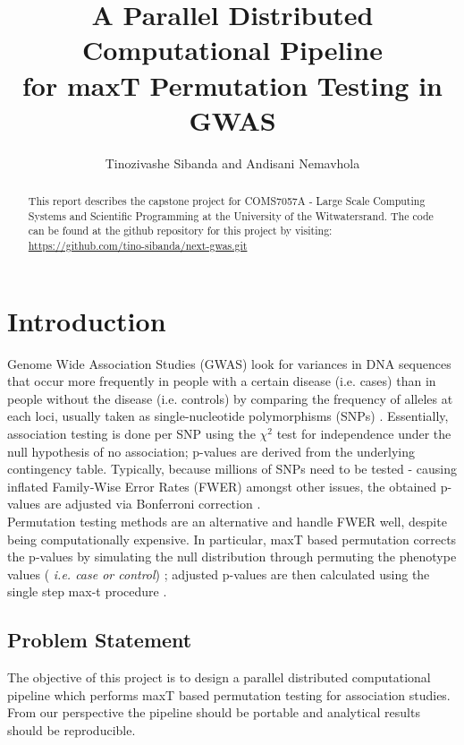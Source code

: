 \documentclass[12pt]{article}
\begin{document}
\title{ A Parallel Distributed Computational Pipeline \\ for maxT Permutation Testing in GWAS
}
\author{Tinozivashe Sibanda and Andisani Nemavhola}

\maketitle
\begin{abstract}
This report describes the capstone project for COMS7057A - Large Scale Computing Systems and Scientific Programming at the University of the Witwatersrand. The code can be found at the github repository for this project by visiting:  \href{next-gwas}{https://github.com/tino-sibanda/next-gwas.git}
\end{abstract}

\section{Introduction}

Genome Wide Association Studies (GWAS) look for variances in DNA sequences that occur more frequently in people with a certain disease (i.e. cases) than in people without the disease (i.e. controls)\cite{Chang2018} by comparing the frequency of alleles at each loci, usually taken as single-nucleotide polymorphisms (SNPs) \cite{Dickhaus2012}. Essentially, association testing is done per SNP using the $\chi^2$ test for independence under the null hypothesis of no association; p-values are derived from the underlying contingency table. Typically, because millions of SNPs need to be tested - causing inflated Family‐Wise Error Rates (FWER) amongst other issues, the obtained p-values are adjusted via Bonferroni correction \cite{Sethuraman2019}.\\

\noindent
Permutation testing methods are an alternative and handle FWER well, despite being computationally expensive. In particular, maxT based permutation corrects the p-values by simulating the null distribution through permuting the phenotype values (\emph{ i.e. case or control}) \cite{Goeman2014};  adjusted p-values are then calculated using the single step max-t procedure \cite{Steiss2012}.
 
\subsection{Problem Statement}
The objective of this project is to design a parallel distributed computational pipeline which performs maxT based permutation testing for association studies. From our perspective the pipeline should be portable and analytical results should be reproducible.
\end{document}
